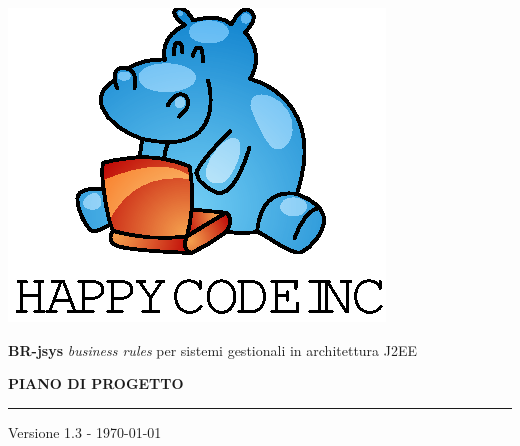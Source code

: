 \documentclass[11pt,titlepage,a4paper]{report}
\begin{document}
\newcommand{\lv}{1.3 } %
\newcommand{\Glossario}{ Glossario.1.4.pdf }

\begin{titlepage}
\begin{center}
\vspace*{0.5in}
\includegraphics{logo.eps}
\vspace*{0.2in}

{\Large \textbf{BR-jsys}}
{\Large \emph{business rules} per sistemi gestionali in architettura J2EE } 
\vspace{2in}

\LARGE \textbf {PIANO DI PROGETTO}
\par\rule{10cm}{0.4pt} \par {\large Versione \lv - \today}


\end{center}
\end{titlepage}
\vspace*{0.5in}
\end{document}
